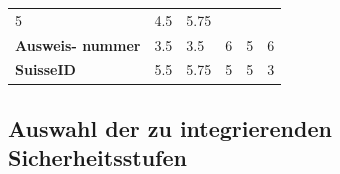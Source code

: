 \begin{longtable}[c]{@{}llllll@{}}
\begin{minipage}[t]{0.11\columnwidth}
5
\strut\end{minipage} &
\begin{minipage}[t]{0.13\columnwidth}\raggedright\strut
4.5
\strut\end{minipage} &
\begin{minipage}[t]{0.13\columnwidth}\raggedright\strut
5.75
\strut\end{minipage}\tabularnewline
\begin{minipage}[t]{0.19\columnwidth}\raggedright\strut
\textbf{Ausweis- nummer}
\strut\end{minipage} &
\begin{minipage}[t]{0.11\columnwidth}\raggedright\strut
3.5
\strut\end{minipage} &
\begin{minipage}[t]{0.15\columnwidth}\raggedright\strut
3.5
\strut\end{minipage} &
\begin{minipage}[t]{0.11\columnwidth}\raggedright\strut
6
\strut\end{minipage} &
\begin{minipage}[t]{0.13\columnwidth}\raggedright\strut
5
\strut\end{minipage} &
\begin{minipage}[t]{0.13\columnwidth}\raggedright\strut
6
\strut\end{minipage}\tabularnewline
\begin{minipage}[t]{0.19\columnwidth}\raggedright\strut
\textbf{SuisseID}
\strut\end{minipage} &
\begin{minipage}[t]{0.11\columnwidth}\raggedright\strut
5.5
\strut\end{minipage} &
\begin{minipage}[t]{0.15\columnwidth}\raggedright\strut
5.75
\strut\end{minipage} &
\begin{minipage}[t]{0.11\columnwidth}\raggedright\strut
5
\strut\end{minipage} &
\begin{minipage}[t]{0.13\columnwidth}\raggedright\strut
5
\strut\end{minipage} &
\begin{minipage}[t]{0.13\columnwidth}\raggedright\strut
3
\strut\end{minipage}\tabularnewline
\bottomrule
\end{longtable}

\subsection{Auswahl der zu integrierenden
Sicherheitsstufen}\label{auswahl-der-zu-integrierenden-sicherheitsstufen}

